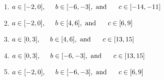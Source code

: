\documentclass[14pt]{extbook}
\begin{document}
\begin{enumerate}
{\begin{center}
\end{center}
\begin{enumerate}[label=\Alph*.]
\item \( a \in [-2, 0], \hspace*{5mm} b \in [-6, -3], \text{ and } \hspace*{5mm} c \in [-14, -11] \)
\item \( a \in [-2, 0], \hspace*{5mm} b \in [4, 6], \text{ and } \hspace*{5mm} c \in [6, 9] \)
\item \( a \in [0, 3], \hspace*{5mm} b \in [4, 6], \text{ and } \hspace*{5mm} c \in [13, 15] \)
\item \( a \in [0, 3], \hspace*{5mm} b \in [-6, -3], \text{ and } \hspace*{5mm} c \in [13, 15] \)
\item \( a \in [-2, 0], \hspace*{5mm} b \in [-6, -3], \text{ and } \hspace*{5mm} c \in [6, 9] \)


\end{enumerate}}
\end{enumerate}
\end{document}

